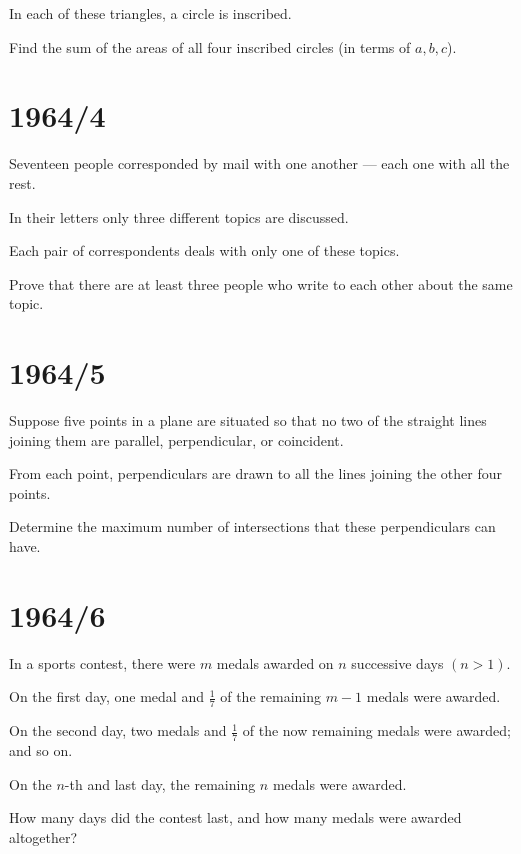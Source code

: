 \documentclass[12pt]{article}
\begin{document}
In each of these triangles, a circle is inscribed.

Find the sum of the areas of all four inscribed circles (in terms of \( a, b, c \)).

\section*{1964/4}

Seventeen people corresponded by mail with one another --- each one with all the rest.

In their letters only three different topics are discussed.

Each pair of correspondents deals with only one of these topics.

Prove that there are at least three people who write to each other about the same topic.

\section*{1964/5}

Suppose five points in a plane are situated so that no two of the straight lines joining them are parallel, perpendicular, or coincident.

From each point, perpendiculars are drawn to all the lines joining the other four points.

Determine the maximum number of intersections that these perpendiculars can have.

\section*{1964/6}

In a sports contest, there were \( m \) medals awarded on \( n \) successive days \((n > 1)\).

On the first day, one medal and \( \frac{1}{7} \) of the remaining \( m-1 \) medals were awarded.

On the second day, two medals and \( \frac{1}{7} \) of the now remaining medals were awarded; and so on.

On the \( n \)-th and last day, the remaining \( n \) medals were awarded.

How many days did the contest last, and how many medals were awarded altogether?
\end{document}
